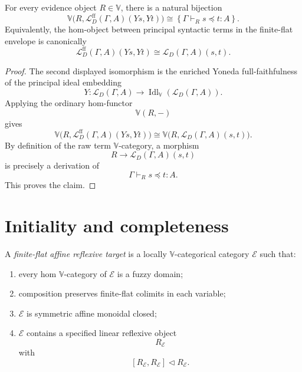 \begin{theorem}
\label{thm:enriched-truth-lemma}
For every evidence object \(R\in\mathbb V\), there is a natural bijection
\[
    \mathbb V
    \bigl(
        R,
        \mathcal L_D^{\mathrm{ff}}(\Gamma,A)(Ys,Yt)
    \bigr)
    \cong
    \left\{
        \Gamma\vdash_R s\preceq t:A
    \right\}.
\]
Equivalently, the hom-object between principal syntactic terms in the
finite-flat envelope is canonically
\[
    \mathcal L_D^{\mathrm{ff}}(\Gamma,A)(Ys,Yt)
    \cong
    \mathcal L_D(\Gamma,A)(s,t).
\]
\end{theorem}

\begin{proof}
The second displayed isomorphism is the enriched Yoneda full-faithfulness of
the principal ideal embedding
\[
    Y:
    \mathcal L_D(\Gamma,A)
    \to
    \operatorname{Idl}_{\mathbb V}(\mathcal L_D(\Gamma,A)).
\]
Applying the ordinary hom-functor
\[
    \mathbb V(R,-)
\]
gives
\[
    \mathbb V
    \bigl(
        R,
        \mathcal L_D^{\mathrm{ff}}(\Gamma,A)(Ys,Yt)
    \bigr)
    \cong
    \mathbb V
    \bigl(
        R,
        \mathcal L_D(\Gamma,A)(s,t)
    \bigr).
\]
By definition of the raw term \(\mathbb V\)-category, a morphism
\[
    R\to \mathcal L_D(\Gamma,A)(s,t)
\]
is precisely a derivation of
\[
    \Gamma\vdash_R s\preceq t:A.
\]
This proves the claim.
\end{proof}

\section{Initiality and completeness}
\label{sec:initiality-completeness-cosmos}

\begin{definition}
\label{def:finite-flat-affine-reflexive-target}
A \emph{finite-flat affine reflexive target} is a locally
\(\mathbb V\)-categorical category \(\mathcal E\) such that:

\begin{enumerate}
    \item every hom \(\mathbb V\)-category of \(\mathcal E\) is a fuzzy domain;

    \item composition preserves finite-flat colimits in each variable;

    \item \(\mathcal E\) is symmetric affine monoidal closed;

    \item \(\mathcal E\) contains a specified linear reflexive object
    \[
        R_{\mathcal E}
    \]
    with
    \[
        [R_{\mathcal E},R_{\mathcal E}]\triangleleft R_{\mathcal E}.
    \]
\end{enumerate}
\end{definition}

